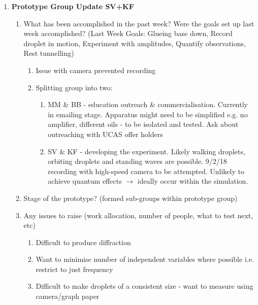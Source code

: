 \begin{enumerate}
\begin{enumerate}
\end{enumerate}

\item  \textbf{Prototype Group Update SV+KF}

\begin{enumerate}
\item What has been accomplished in the past week? Were the goals set up last week accomplished? (Last Week Goals: Glueing base down, Record droplet in motion, Experiment with amplitudes, Quantify observations, Rest tunnelling)

\begin{enumerate}
\item  Issue with camera prevented recording

\item  Splitting group into two:

\begin{enumerate}
\item  MM \& BB - education outreach \& commercialisation. Currently in emailing stage. Apparatus might need to be simplified e.g. no amplifier, different oils - to be isolated and tested. Ask about outreaching with UCAS offer holders

\item  SV \& KF - developing the experiment. Likely walking droplets, orbiting droplets and standing waves are possible. 9/2/18 recording with high-speed camera to be attempted. Unlikely to achieve quantum effects $\mathrm{\to}$ ideally occur within the simulation.
\end{enumerate}
\end{enumerate}

\item  Stage of the prototype? (formed sub-groups within prototype group)

\item  Any issues to raise (work allocation, number of people, what to test next, etc)

\begin{enumerate}
\item  Difficult to produce diffraction

\item  Want to minimise number of independent variables where possible i.e. restrict to just frequency

\item  Difficult to make droplets of a consistent size - want to measure using camera/graph paper
\end{enumerate}


\end{enumerate}
\end{enumerate}
